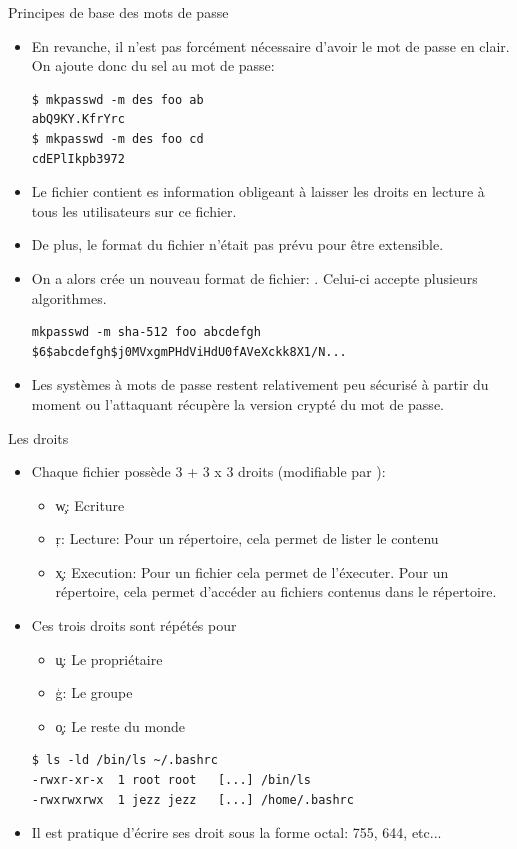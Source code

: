 \begin{frame}[fragile=singleslide]{Principes de base des mots de passe}
\begin{itemize}
\item En revanche, il n'est  pas forcément nécessaire d'avoir le mot de
  passe en clair. On ajoute donc du sel au mot de passe:
\begin{lstlisting}
$ mkpasswd -m des foo ab
abQ9KY.KfrYrc
$ mkpasswd -m des foo cd
cdEPlIkpb3972
\end{lstlisting}
\item Le fichier   contient es information obligeant
  à  laisser les  droits en  lecture à  tous les  utilisateurs  sur ce
  fichier.
\item  De plus, le  format du  fichier   n'était pas
  prévu pour être extensible.
\item   On   a   alors    crée   un   nouveau   format   de   fichier:
  .  Celui-ci accepte plusieurs algorithmes.
\begin{lstlisting}
mkpasswd -m sha-512 foo abcdefgh
$6$abcdefgh$j0MVxgmPHdViHdU0fAVeXckk8X1/N...
\end{lstlisting}
\item Les systèmes à mots de passe restent relativement peu sécurisé à
  partir du moment ou l'attaquant récupère la version crypté du mot de
  passe.
\end{itemize}
\end{frame}

\begin{frame}[fragile=singleslide]{Les droits}
  \begin{itemize}
  \item  Chaque fichier  possède  3 +  3  x 3  droits (modifiable  par
    ):
    \begin{itemize}
    \item \c{w}: Ecriture
    \item \c{r}: Lecture: Pour un répertoire, cela permet de lister le contenu
    \item \c{x}: Execution: Pour un fichier cela permet de
      l'éxecuter. Pour un répertoire, cela permet d'accéder au
      fichiers contenus dans le répertoire.
    \end{itemize}
  \item Ces trois droits sont répétés pour
    \begin{itemize}
    \item \c{u}: Le propriétaire
    \item \c{g}: Le groupe
    \item \c{o}: Le reste du monde
    \end{itemize}
    \begin{lstlisting}[columns=fixed]
$ ls -ld /bin/ls ~/.bashrc
-rwxr-xr-x  1 root root   [...] /bin/ls
-rwxrwxrwx  1 jezz jezz   [...] /home/.bashrc
    \end{lstlisting}
  \item Il est  pratique d'écrire ses droit sous  la forme octal: 755,
    644, etc...
  \end{itemize}
\end{frame}

